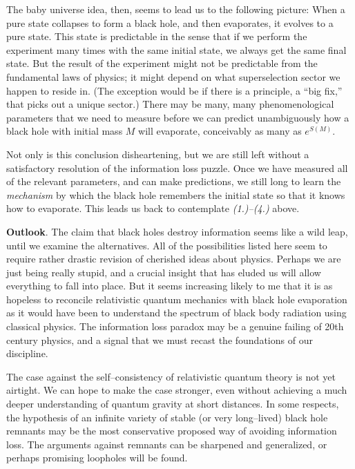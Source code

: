 The baby universe idea, then, seems to lead us to the following picture\hawkF:
When
a pure state collapses to form a black hole, and then evaporates, it evolves to
a pure state.  This state is predictable in the sense that if we perform the
experiment many times with the same initial state, we always get the same final
state.  But the result of the experiment might not be predictable from the
fundamental laws of physics; it might depend on what superselection sector we
happen to reside in.  (The exception would be if there is a principle, a ``big
fix,'' that picks out a unique sector.)  There may be many, many
phenomenological parameters that we need to measure before we can predict
unambiguously how a black hole with initial mass $M$ will evaporate,
conceivably as many as $e^{S(M)}$.

Not only is this conclusion disheartening, but we are still left without a
satisfactory resolution of the information loss puzzle.  Once we have
measured all of the relevant parameters, and can make predictions, we still
long to
learn the {\it mechanism} by which the black hole remembers the initial state
so that it knows how to evaporate.  This leads us back to contemplate {\it
(1.)--(4.)} above.

\bigskip
{\bf Outlook}.  The claim that black holes destroy information seems like a
wild leap, until we examine the alternatives.  All of the possibilities listed
here seem to require rather drastic revision of cherished ideas about physics.
Perhaps we are just being really stupid, and a crucial insight that has eluded
us will allow everything to fall into place.  But it seems increasing likely to
me that it is as hopeless to reconcile relativistic quantum mechanics with
black hole
evaporation as it would have been to understand the spectrum of black body
radiation using classical physics.  The information loss paradox may be a
genuine failing of 20th century physics, and a signal that we must recast the
foundations of our discipline.

The case against the self--consistency of relativistic quantum theory is not
yet airtight.  We can hope to make the case stronger, even without achieving a
much deeper understanding of quantum gravity at short distances.  In some
respects, the hypothesis of an infinite variety of stable (or very long--lived)
black hole remnants may be the most conservative proposed way of avoiding
information loss.  The arguments against remnants can be sharpened and
generalized, or perhaps promising loopholes will be found.

